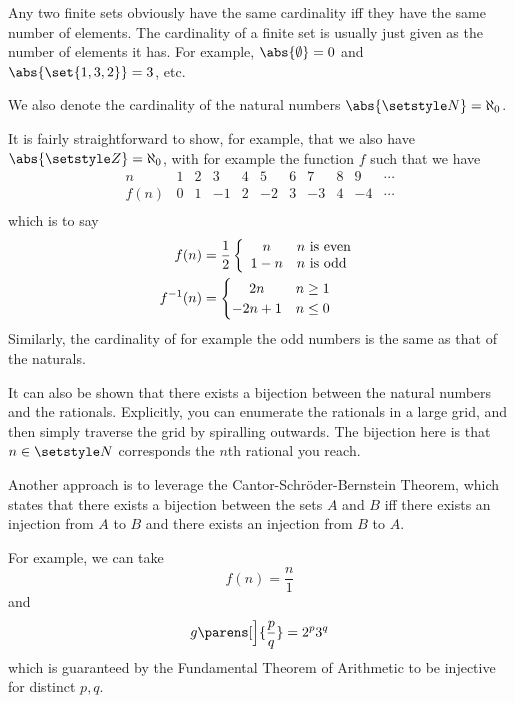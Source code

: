Any two finite sets obviously have the same cardinality iff they have the same
number of elements. The cardinality of a finite set is usually just given as the
number of elements it has. For example, \(\abs{\emptyset} = 0\) and
\(\abs{\set{1, 3, 2}} = 3\), etc.

We also denote the cardinality of the natural numbers
\(\abs{\Naturals} = \aleph_0\).

It is fairly straightforward to show, for example, that we also have
\(\abs{\Integers} = \aleph_0\), with for example the function \(f\) such that we
have
\begin{equation*}
 \begin{array}{c|r|r|r|r|r|r|r|r|r|r}
  n & 1 & 2 & 3 & 4 & 5 & 6 & 7 & 8 & 9 & \cdots \\
  \hline
  f(n) & 0 & 1 & -1 & 2 & -2 & 3 & -3 & 4 & -4 & \cdots \\
 \end{array}
\end{equation*}
which is to say
\begin{align*}
 f(n) &=
  \frac 12 \left\{
  \begin{array}{cl}
   n & \text{\(n\) is even} \\
   1 - n & \text{\(n\) is odd}
  \end{array}
  \right. \\
 f^{-1}(n) &=
  \begin{cases}
   \hfil 2n & n \ge 1 \\
   \hfil -2n + 1 & n \le 0
  \end{cases}
\end{align*}
Similarly, the cardinality of for example the odd numbers is the same as that of
the naturals.

It can also be shown that there exists a bijection between the natural numbers
and the rationals. Explicitly, you can enumerate the rationals in a large grid,
and then simply traverse the grid by spiralling outwards. The bijection here is
that \(n \in \Naturals\) corresponds the \(n\)th rational you reach.

Another approach is to leverage the Cantor-Schr\"oder-Bernstein Theorem, which
states that there exists a bijection between the sets \(A\) and \(B\) iff there
exists an injection from \(A\) to \(B\) and there exists an injection from \(B\)
to \(A\).

For example, we can take
\begin{equation*}
 f(n) = \frac n1
\end{equation*}
and
\begin{equation*}
 g\parens[\Big]{\frac pq} = 2^p 3^q
\end{equation*}
which is guaranteed by the Fundamental Theorem of Arithmetic to be injective for
distinct \(p, q\).

